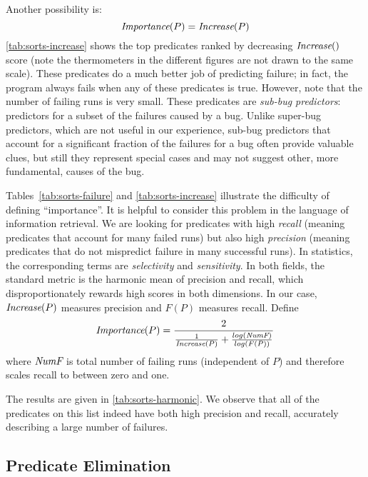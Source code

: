 Another possibility is:
\[ \textit{Importance}(P) = \textit{Increase}(P) \]
\autoref{tab:sorts-increase} shows the top predicates ranked by decreasing
$\textit{Increase}()$ score (note the thermometers in the different figures
are not drawn to the same scale).  These predicates do a much better
job of predicting failure; in fact, the program always fails when any
of these predicates is true. However, note that the number of failing
runs is very small.  These predicates are {\em sub-bug predictors}:
predictors for a subset of the failures caused by a bug.  Unlike
super-bug predictors, which are not useful in our experience, sub-bug
predictors that account for a significant fraction of the failures for
a bug often provide valuable clues, but still they represent special
cases and may not suggest other, more fundamental, causes of the bug.

Tables~\ref{tab:sorts-failure} and \ref{tab:sorts-increase} illustrate the difficulty of defining
``importance''.  It is helpful to consider this problem in the language of information
retrieval. We are looking for predicates with
high {\em recall} (meaning predicates that account for many failed runs) but also high {\em precision}
(meaning predicates that do not mispredict failure in many successful runs).  In statistics,
the corresponding terms are {\em selectivity} and {\em sensitivity}.  In both fields,
the standard metric is the harmonic mean of precision and recall, which disproportionately
rewards high scores in both dimensions.
In our case, $\textit{Increase}(P)$ measures precision and $F(P)$ measures recall.  Define
\[ \textit{Importance}(P) = \frac{2}{\frac{1}{\textit{Increase}(P)} + \frac{log(\textit{NumF})}{log(F(P))}} \]
where $\textit{NumF}$ is total number of failing runs (independent of $P$)
and therefore scales recall to between zero and one.

The results are given in \autoref{tab:sorts-harmonic}.  We observe that
all of the predicates on this list indeed have both high precision and
recall, accurately describing a large number of failures. 


\subsection{Predicate Elimination}
\label{sec:elimination}

